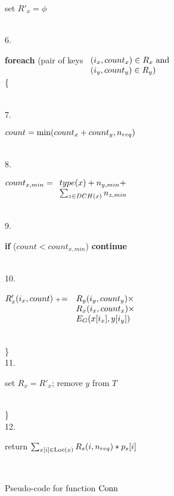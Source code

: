 \begin{figure}[htbp]
\begin{center}
{\begin{minipage}[t]{3.3in}
\begin{minipage}[t]{2.80in}
   		  set $R'_x= \phi$
		  \end{minipage}
		  \\
   6.   \begin{minipage}[t]{2.80in}
   		  {\bf foreach} (pair of keys
		       		$\begin{array}[t]{l}
				 (i_x, count_x) \in R_x \mbox { and }\\
		   		 (i_y, count_y) \in R_y)
				 \end{array}
				$ \\ 
		  \{
		  \end{minipage}
		  \\
   7.   \begin{minipage}[t]{2.60in}
   		  $count= \min (count_x + count_y, {n_{req}})$
		  \end{minipage}
		  \\
   8.   \begin{minipage}[t]{2.60in}
   		  $count_{x,min}= \begin{array}[t]{l}
		  		  type(x) + n_{y,min} + \\
		       	   	  \sum_{z \in {DCH}(x)} n_{z,min}
				  \end{array}$
		  \end{minipage}
		  \\
   9.   \begin{minipage}[t]{2.60in}
   		  {\bf if} ($count < count_{x,min}$) {\bf continue} 
		  \end{minipage}
		  \\
   10.   \begin{minipage}[t]{2.60in}
   		  $R'_x (i_x,count) {\;{\scriptstyle +} \! =}$ 
		  	$\begin{array}[t]{l}
			 R_y(i_y,count_y) \times \\
			 R_x(i_x,count_x) \times \\
			 E_G(x[i_x], y[i_y])
		  	 \end{array}$
		  \end{minipage}
		  \\
        \} \\
   11.  \begin{minipage}[t]{2.60in}
       		  set $R_x= R'_x$; remove $y$ from $T$
		   \end{minipage}
		   \\
        \} \\
   12. \begin{minipage}[t]{3.00in}
       return $\sum_{x[i] \in {\mathrm {Loc}}(x)} R_s(i,{n_{req}}) * p_s[i]$
       \end{minipage}
       \\
    \end{minipage}	
}
\end{center}
    \normalsize
    \caption{Pseudo-code for function ${\mathrm {Conn}}$}
    \label{alg:Conn}
\vspace*{-0.1in}
    \end{figure}

